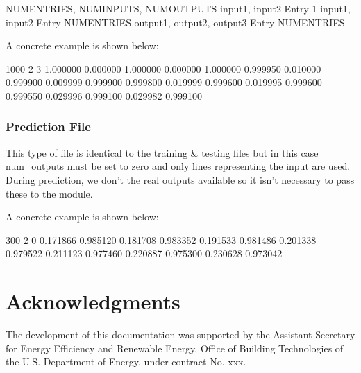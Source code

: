 \documentclass[letterpaper,10pt,english]{sphinxmanual}
\begin{document}
\begin{sphinxVerbatim}[commandchars=\\\{\}]
NUM\PYGZus{}ENTRIES, NUM\PYGZus{}INPUTS, NUM\PYGZus{}OUTPUTS
input\PYGZus{}1, input\PYGZus{}2 \PYGZsh{} Entry 1
input\PYGZus{}1, input\PYGZus{}2 \PYGZsh{} Entry NUM\PYGZus{}ENTRIES
output\PYGZus{}1, output\PYGZus{}2, output\PYGZus{}3 \PYGZsh{} Entry NUM\PYGZus{}ENTRIES
\end{sphinxVerbatim}

A concrete example is shown below:

\begin{sphinxVerbatim}[commandchars=\\\{\}]
1000 2 3
1.000000 0.000000
1.000000 0.000000 1.000000
0.999950 0.010000
0.999900 0.009999 0.999900
0.999800 0.019999
0.999600 0.019995 0.999600
0.999550 0.029996
0.999100 0.029982 0.999100
\end{sphinxVerbatim}


\subsection{Prediction File}
\label{\detokenize{help:prediction-file}}
This type of file is identical to the training \& testing files but in this case
num\_outputs must be set to zero and only lines representing the input are used.
During prediction, we don't the real outputs available so it isn't necessary to pass
these to the module.

A concrete example is shown below:

\begin{sphinxVerbatim}[commandchars=\\\{\}]
300 2 0
\PYGZhy{}0.171866 0.985120
\PYGZhy{}0.181708 0.983352
\PYGZhy{}0.191533 0.981486
\PYGZhy{}0.201338 0.979522
\PYGZhy{}0.211123 0.977460
\PYGZhy{}0.220887 0.975300
\PYGZhy{}0.230628 0.973042
\end{sphinxVerbatim}


\chapter{Acknowledgments}
\label{\detokenize{acknowledgments::doc}}\label{\detokenize{acknowledgments:acknowledgments}}
The development of this documentation was supported
by the Assistant Secretary for Energy Efficiency and Renewable Energy,
Office of Building Technologies of the U.S. Department of Energy,
under contract No. xxx.
\end{document}
